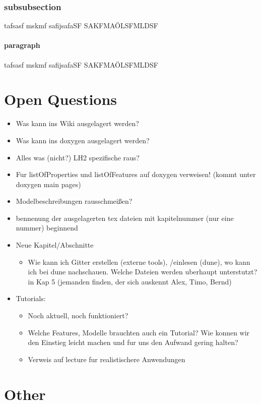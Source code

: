 \subsubsection{subsubsection}
tafsasf mskmf safijsafaSF SAKFMAÖLSFMLDSF

\paragraph{paragraph}
tafsasf mskmf safijsafaSF SAKFMAÖLSFMLDSF

\section{Open Questions}
\begin{itemize}
  \item Was kann ins Wiki ausgelagert werden?
  \item Was kann ins doxygen ausgelagert werden?
  \item Alles was (nicht?) LH2 spezifische raus?
  \item Fur listOfProperties und listOfFeatures auf doxygen verweisen! (kommt
        unter doxygen main pages)
  \item Modelbeschreibungen rausschmeißen?
  \item bennenung der ausgelagerten tex dateien mit kapitelnummer (nur eine nummer)
        beginnend
  \item Neue Kapitel/Abschnitte
  \begin{itemize}
    \item Wie kann ich Gitter erstellen (externe tools), /einlesen (dune), wo
          kann ich bei dune nachschauen. Welche Dateien werden uberhaupt unterstutzt?
          in Kap 5 (jemanden finden, der sich auskennt Alex, Timo, Bernd)
  \end{itemize}
  \item Tutorials:
  \begin{itemize}
    \item Noch aktuell, noch funktioniert?
    \item Welche Features, Modelle brauchten auch ein Tutorial? Wie konnen wir
          den Einstieg leicht machen und fur uns den Aufwand gering halten?
    \item Verweis auf lecture fur realistischere Anwendungen
  \end{itemize}
\end{itemize}

\section{Other}
